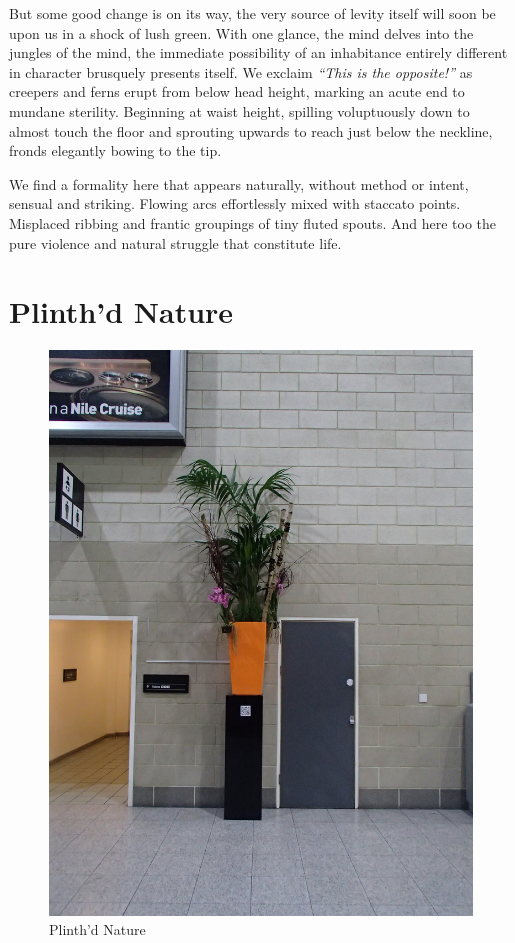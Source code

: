 \documentclass{book}
\begin{document}
But some good change is on its way, the very source of levity itself will soon
be upon us in a shock of lush green. With one glance, the mind delves into the
jungles of the mind, the immediate possibility of an inhabitance entirely
different in character brusquely presents itself. We exclaim \emph{``This is
the opposite!''} as creepers and ferns erupt from below head height, marking an
acute end to mundane sterility. Beginning at waist height, spilling
voluptuously down to almost touch the floor and sprouting upwards to reach just
below the neckline, fronds elegantly bowing to the tip.

We find a formality here that appears naturally, without method or intent,
sensual and striking. Flowing arcs effortlessly mixed with staccato points.
Misplaced ribbing and frantic groupings of tiny fluted spouts. And here too
the pure violence and natural struggle that constitute life.

\chapter{Plinth'd Nature}

\begin{figure}
\centering
\includegraphics[width=\textwidth,angle=90]{figures/P1050143.JPG}
\caption{Plinth'd Nature}
\end{figure}
\end{document}
